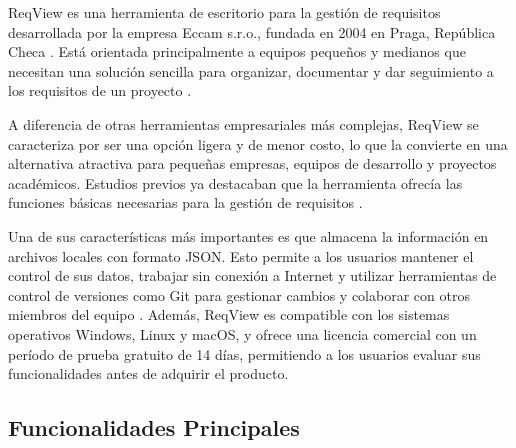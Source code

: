 \documentclass[journal,onecolumn]{IEEEtran}
\begin{document}
ReqView es una herramienta de escritorio para la gestión de requisitos desarrollada por la
empresa Eccam s.r.o., fundada en 2004 en Praga, República Checa \cite{reqview2026}. Está
orientada principalmente a equipos pequeños y medianos que necesitan una solución sencilla
para organizar, documentar y dar seguimiento a los requisitos de un proyecto
\cite{khoroshilov2019}.

A diferencia de otras herramientas empresariales más complejas, ReqView se caracteriza por
ser una opción ligera y de menor costo, lo que la convierte en una alternativa atractiva
para pequeñas empresas, equipos de desarrollo y proyectos académicos. Estudios previos ya
destacaban que la herramienta ofrecía las funciones básicas necesarias para la gestión de
requisitos \cite{khoroshilov2019}.

Una de sus características más importantes es que almacena la información en archivos
locales con formato JSON. Esto permite a los usuarios mantener el control de sus datos,
trabajar sin conexión a Internet y utilizar herramientas de control de versiones como Git
para gestionar cambios y colaborar con otros miembros del equipo \cite{khoroshilov2019}.
Además, ReqView es compatible con los sistemas operativos Windows, Linux y macOS, y ofrece
una licencia comercial con un período de prueba gratuito de 14 días, permitiendo a los
usuarios evaluar sus funcionalidades antes de adquirir el producto.

\subsection{Funcionalidades Principales}
\end{document}
